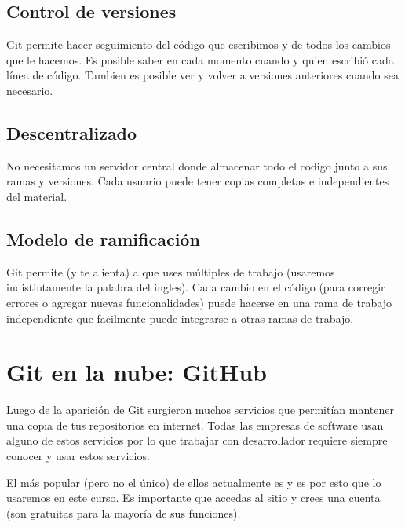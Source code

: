\documentclass[a4paper,12pt,spanish]{sphinxmanual}
\begin{document}
\section{Control de versiones}
\label{\detokenize{git:control-de-versiones}}
\sphinxAtStartPar
Git permite hacer seguimiento del código que
escribimos y de todos los cambios que le hacemos. Es posible saber
en cada momento cuando y quien escribió cada línea de código.
Tambien es posible ver y volver a versiones anteriores cuando sea
necesario.


\section{Descentralizado}
\label{\detokenize{git:descentralizado}}
\sphinxAtStartPar
No necesitamos un servidor central donde almacenar todo el codigo
junto a sus ramas y versiones.
Cada usuario puede tener copias completas e independientes del material.


\section{Modelo de ramificación}
\label{\detokenize{git:modelo-de-ramificacion}}
\sphinxAtStartPar
Git permite (y te alienta) a que uses múltiples  de trabajo
(usaremos indistintamente la palabra  del ingles).
Cada cambio en el código (para corregir errores o agregar nuevas
funcionalidades) puede hacerse en una rama de trabajo independiente
que facilmente puede integrarse a otras ramas de trabajo.

\sphinxstepscope


\chapter{Git en la nube: GitHub}
\label{\detokenize{github:git-en-la-nube-github}}\label{\detokenize{github::doc}}
\sphinxAtStartPar
Luego de la aparición de Git surgieron muchos servicios que
permitían mantener una copia de tus repositorios en internet.
Todas las empresas de software usan alguno de estos servicios
por lo que trabajar con desarrollador requiere siempre conocer
y usar estos servicios.

\sphinxAtStartPar
El más popular (pero no el único) de ellos actualmente es
 y es por esto que lo usaremos
en este curso.
Es importante que accedas al sitio y crees una cuenta (son gratuitas
para la mayoría de sus funciones).
\end{document}
